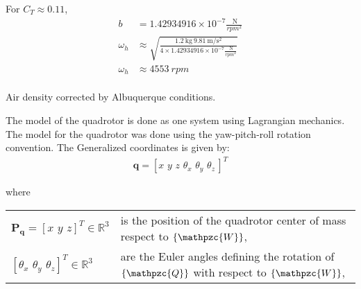 \documentclass[letterpaper, 12pt]{article}
\begin{document}
For $C_T \approx 0.11$,
\begin{align}
 b &= 1.42934916 \times 10^{-7} \frac{\SI{}{\newton}}{rpm^2}\\
  \omega_h &\approx \sqrt{\frac{\SI{1.2}{\kilo\gram}\ \SI{9.81}{\meter/\second^2}}{4 \times 1.42934916 \times 10^{-7} \frac{\SI{}{\newton}}{rpm^2}}}\\
  \omega_h &\approx 4553\ rpm\\
\end{align}


Air density corrected by Albuquerque conditions. 

The model of the quadrotor is done as one system using Lagrangian mechanics. The model for the quadrotor was done using the yaw-pitch-roll rotation convention. The Generalized coordinates is given by:
\begin{align}
\mathbf{q} = \left[x\,\,y\,\,z\,\,\theta_x\,\,\theta_y\,\,\theta_z\,\right]^\mathit{T}
\label{eq:gen_pos_vector}
\end{align}

where
\begin{center}
	\begin{tabular}{l l}
		$\mathbf{P_q}=\left[x\,\,y\,\,z\right]^\mathit{T} \in \mathbb{R}^3$ & is the position of the quadrotor center of mass respect to $\lbrace\mathpzc{W}\rbrace$,\\
		$\left[\theta_x\,\,\theta_y\,\,\theta_z\right]^\mathit{T} \in \mathbb{R}^3$ & are the Euler angles defining the rotation of $\lbrace\mathpzc{Q}\rbrace$ with respect to $\lbrace\mathpzc{W}\rbrace$,\\
	\end{tabular}
\end{center}
\end{document}
